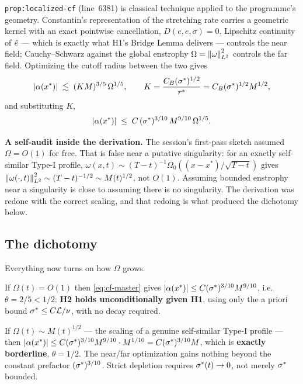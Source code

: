 \texttt{prop:localized-cf} (line~6381) is classical technique applied to the
programme's geometry. Constantin's representation of the stretching rate
carries a geometric kernel with an exact pointwise cancellation,
\(D(e,e,\sigma)=0\). Lipschitz continuity of \(\hat{e}\) --- which is exactly
what H1's Bridge Lemma delivers --- controls the near field; Cauchy--Schwarz
against the global enstrophy \(\Omega=\left\|\omega\right\|_{L^2}^2\) controls the far
field. Optimizing the cutoff radius between the two gives
\[
  \left|\alpha(x^*)\right| \;\lesssim\; (KM)^{3/5}\,\Omega^{1/5},
  \qquad K = \frac{C_B(\sigma^{*})^{1/2}}{r^{*}} = C_B(\sigma^{*})^{1/2}M^{1/2},
\]
and substituting \(K\),
\begin{equation}\label{eq:cf-master}
  \left|\alpha(x^*)\right| \;\le\; C\,(\sigma^{*})^{3/10}\,M^{9/10}\,\Omega^{1/5}.
\end{equation}

\begin{record}
\textbf{A self-audit inside the derivation.} The session's first-pass sketch
assumed \(\Omega=O(1)\) for free. That is false near a putative singularity:
for an exactly self-similar Type-I profile,
\(\omega(x,t)\sim(T-t)^{-1}\Omega_0\!\left((x-x^*)/\sqrt{T-t}\right)\) gives
\(\left\|\omega(\cdot,t)\right\|_{L^2}^2\sim(T-t)^{-1/2}\sim M(t)^{1/2}\), not
\(O(1)\). Assuming bounded enstrophy near a singularity is close to assuming
there is no singularity. The derivation was redone with the correct scaling,
and that redoing is what produced the dichotomy below.
\end{record}

\subsection{The dichotomy}

Everything now turns on how \(\Omega\) grows.

\begin{statement}
\label{st:regA}
If \(\Omega(t)=O(1)\) then \eqref{eq:cf-master} gives
\(\left|\alpha(x^*)\right|\le C(\sigma^{*})^{3/10}M^{9/10}\), i.e.\ \(\theta=2/5<1/2\):
\textbf{H2 holds unconditionally given H1}, using only the a priori bound
\(\sigma^{*}\le C\mathcal{L}/\nu\), with no decay required.
\end{statement}

\begin{statement}
\label{st:regB}
If \(\Omega(t)\sim M(t)^{1/2}\) --- the scaling of a genuine self-similar
Type-I profile --- then
\(\left|\alpha(x^*)\right|\le C(\sigma^{*})^{3/10}M^{9/10}\cdot M^{1/10}
= C(\sigma^{*})^{3/10}M\), which is \textbf{exactly borderline},
\(\theta=1/2\). The near/far optimization gains nothing beyond the constant
prefactor \((\sigma^{*})^{3/10}\). Strict depletion requires \(\sigma^{*}(t)\to0\),
not merely \(\sigma^{*}\) bounded.
\end{statement}

